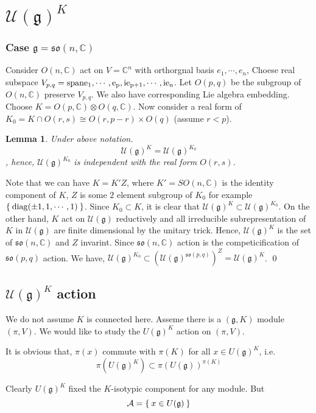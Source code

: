 \documentclass[12pt]{article}
\newtheorem{lemma}{Lemma}
\def\bC{{\mathbb{C}}}
\def\sspan{\rm{span}}
\def\aso{\mathfrak{so}}
\def\diag#1{\mathrm{diag}(#1)}
\def\fgg{\mathfrak{g}}
\def\caa{\mathcal{A}}
\def\cuu{\mathcal{U}}
\begin{document}
\section{$\cuu(\fgg)^K$}
\subsubsection{Case $\fgg=\aso(n,\bC)$} 
Consider $O(n,\bC)$ act on $V=\bC^n$ with orthorgnal basis $e_1, \cdots, e_n$, 
Choese real subspace $V_{p,q} = \sspan{e_1, \cdots, e_p, ie_{p+1},\cdots, ie_n}$.
Let $O(p,q)$ be the subgroup of $O(n,\bC)$ preserve $V_{p,q}$. We also have corresponding Lie algebra embedding. 
Choose $K = O(p,\bC)\otimes O(q,\bC)$. Now consider a real form of 
$K_0 = K\cap O(r,s) \cong O(r,p-r)\times O(q)$ (assume $r<p$).

\begin{lemma} Under above notation.
\[\cuu(\fgg)^{K} = \cuu(\fgg)^{K_0}\], 
hence, $\cuu(\fgg)^{K_0}$ is independent with the real form $O(r,s)$. 
\end{lemma}
\proof Note that we can have $K=K'Z$, where $K' = SO(n,\bC)$ is the identity component of
 $K$, $Z$ is some $2$ element subgroup of $K_0$ 
for example $\Set{\diag{\pm 1,1, \cdots, 1}}$. Since $K_0\subset K$, 
it is clear that $\cuu(\fgg)^K\subset \cuu(\fgg)^{K_0}$.
On the other hand, $K$ act on $\cuu(\fgg)$ reductively
and all irreducible subrepresentation of $K$ in $\cuu(\fgg)$ 
are finite dimensional by the unitary trick. Hence, 
$\cuu(\fgg)^K$ is the set of $\aso(n,\bC)$ and $Z$ invarint.
Since $\aso(n,\bC)$ action is the competicification of $\aso(p,q)$ action.
We have, $\cuu(\fgg)^{K_0} \subset (\cuu(\fgg)^{\aso(p,q)})^Z = \cuu(\fgg)^K$.
\qed

\subsection{$\cuu(\fgg)^K$ action}
We do not assume $K$ is connected here.  
Asseme there is a $(\fgg,K)$ module $(\pi,V)$.
We would like to study the $U(\fgg)^K$ action on $(\pi,V)$. 

It is obvious that, 
$\pi(x)$ commute with $\pi(K)$ for all $x \in U(\fgg)^K$, i.e. 
\[
\pi(U(\fgg)^K) \subset \pi(U(\fgg))^{\pi(K)}
\]


Clearly $U(\fgg)^K$ fixed the $K$-isotypic component for any module.
But 
\[
\caa =\Set{x\in U(\fgg)}
\]
\end{document}
